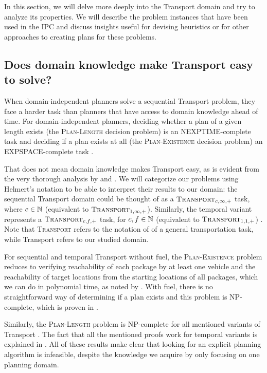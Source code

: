 In this section, we will delve more deeply into the Transport domain and try to analyze its properties.
We will describe the problem instances that have been used in the IPC and discuss insights useful for devising heuristics or for other approaches to creating plans for these problems.

\subsection{Does domain knowledge make Transport easy to solve?}

When domain-independent planners solve a sequential Transport problem,
they face a harder task than planners that have access to domain knowledge ahead of time.
For domain-independent planners, deciding whether a plan of a given length exists
(the \textsc{Plan-Length} decision problem) is
an NEXPTIME-complete task
and deciding if a plan exists at all (the \textsc{Plan-Existence} decision problem)
an EXPSPACE-complete task \citep[Table~3.2]{Ghallab2004}.

That does not mean domain knowledge makes Transport easy, as is evident from
the very thorough analysis by \citet{Helmert2001} and \citet{Helmert2001a}.
We will categorize our problems using Helmert's notation to
be able to interpret their results to our domain:
the sequential Transport domain could be thought of as a $\textsc{Transport}_{c,\infty,+}$ task, where $c \in \mathbb{N}$
(equivalent to $\textsc{Transport}_{1,\infty,+}$).
Similarly, the temporal variant represents a $\textsc{Transport}_{c,f,+}$ task, for $c, f \in \mathbb{N}$
(equivalent to $\textsc{Transport}_{1,1,+}$) . Note that
\textsc{Transport} refers to the notation of \citet{Helmert2001a} of a general transportation
task, while Transport refers to our studied domain.

For sequential and temporal Transport without fuel, the \textsc{Plan-Existence} problem
reduces to verifying reachability of each package by at least one vehicle
and the reachability of target locations from the starting locations of all packages,
which we can do in polynomial time, as noted by \citet[Theorem 8]{Helmert2001}.
With fuel, there is no straightforward way of determining
if a plan exists and this problem is NP-complete, which is proven in \citet[Theorem 9 and 10]{Helmert2001}.

Similarly, the \textsc{Plan-Length} problem is NP-complete for all mentioned variants of Transport
\citep[Section~3.6]{Helmert2001a}.
The fact that all the mentioned proofs work for temporal variants is explained in \citet[Section~3.5]{Helmert2001a}.
All of these results make clear that looking for an explicit planning algorithm is infeasible,
despite the knowledge we acquire by only focusing on one planning domain.

